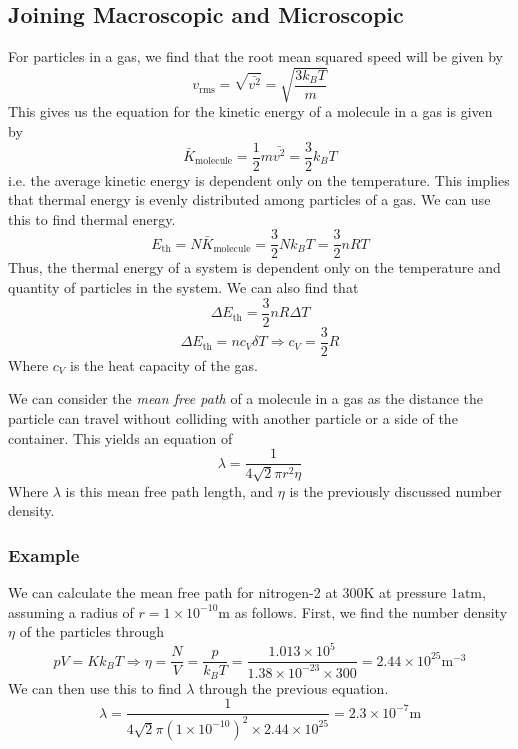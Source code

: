 \documentclass[12pt]{report}
\begin{document}
\begin{flushleft}
\subsection*{Joining Macroscopic and Microscopic}

For particles in a gas, we find that the root mean squared speed will be given
by
\[v_\mathrm{rms} = \sqrt{\bar{v^2}} = \sqrt{\frac{3k_BT}{m}}\]
This gives us the equation for the kinetic energy of a molecule in a gas is
given by
\[\bar{K}_\mathrm{molecule} = \frac{1}{2}m\bar{v^2} = \frac{3}{2}k_BT\]
i.e. the average kinetic energy is dependent only on the temperature. This
implies that thermal energy is evenly distributed among particles of a gas. We
can use this to find thermal energy.
\[E_\mathrm{th} = N\bar{K}_\mathrm{molecule} = \frac{3}{2}Nk_BT 
= \frac{3}{2}nRT\]
Thus, the thermal energy of a system is dependent only on the temperature and
quantity of particles in the system. We can also find that
\[\Delta E_\mathrm{th} = \frac{3}{2}nR\Delta T\]
\[\Delta E_\mathrm{th} = nc_V\delta T \Rightarrow c_V = \frac{3}{2}R\]
Where \(c_V\) is the heat capacity of the gas. \par
We can consider the \textit{mean free path} of a molecule in a gas as the
distance the particle can travel without colliding with another particle or a
side of the container. This yields an equation of
\[\lambda = \frac{1}{4\sqrt{2}\pi r^2\eta}\]
Where \(\lambda\) is this mean free path length, and \(\eta\) is the previously
discussed number density.

\subsubsection*{Example}
We can calculate the mean free path for nitrogen-2 at \(300\mathrm{K}\) at
pressure \(1\mathrm{atm}\), assuming a radius of
\(r = 1\times10^{-10}\mathrm{m}\) as follows. First, we find the number density
\(\eta\) of the particles through
\[pV = Kk_BT \Rightarrow \eta = \frac{N}{V} = \frac{p}{k_BT}
= \frac{1.013\times10^5}{1.38\times10^{-23}\times300}
= 2.44\times10^{25}\mathrm{m}^{-3}\]
We can then use this to find \(\lambda\) through the previous equation.
\[\lambda = \frac{1}{4\sqrt{2}\pi(1\times10^{-10})^2\times2.44\times10^{25}}
= 2.3\times10^{-7}\mathrm{m}\]

\end{flushleft}
\end{document}
